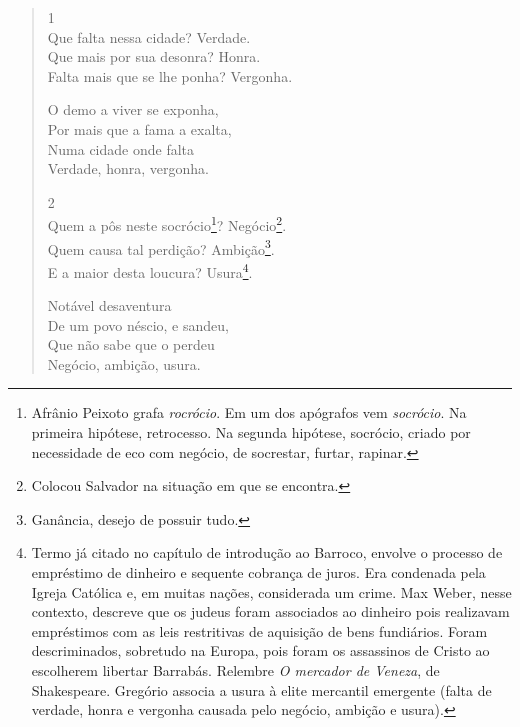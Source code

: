 \begin{verse}
1 \\
Que falta nessa cidade? \dotfill Verdade. \\
Que mais por sua desonra? \dotfill Honra. \\
Falta mais que se lhe ponha? \dotfill Vergonha.
			
\hspace{5em} O demo a viver se exponha, \\
\hspace{5em} Por mais que a fama a exalta, \\
\hspace{5em} Numa cidade onde falta \\
\hspace{5em} Verdade, honra, vergonha. 
			
2 \\
Quem a pôs neste socrócio\footnote{Afrânio Peixoto grafa \textit{rocrócio}. Em um dos apógrafos vem \textit{socrócio}. Na primeira hipótese, retrocesso. Na segunda hipótese, socrócio, criado por necessidade de eco com negócio, de socrestar, furtar, rapinar.}? \dotfill Negócio\footnote{Colocou Salvador na situação em que se encontra.}. \\
Quem causa tal perdição? \dotfill Ambição\footnote{Ganância, desejo de possuir tudo.}. \\
E a maior desta loucura? \dotfill Usura\footnote{Termo já citado no capítulo de introdução ao Barroco, envolve o processo de empréstimo de dinheiro e sequente cobrança de juros. Era condenada pela Igreja Católica e, em muitas nações, considerada um crime. Max Weber, nesse contexto, descreve que os judeus foram associados ao dinheiro pois realizavam empréstimos com as leis restritivas de aquisição de bens fundiários. Foram descriminados, sobretudo na Europa, pois foram os assassinos de Cristo ao escolherem libertar Barrabás. Relembre \textit{O mercador de Veneza}, de Shakespeare. Gregório associa a usura à elite mercantil emergente (falta de verdade, honra e vergonha causada pelo negócio, ambição e usura).}.
			
\hspace{5em} Notável desaventura \\
\hspace{5em} De um povo néscio, e sandeu, \\
\hspace{5em} Que não sabe que o perdeu \\
\hspace{5em} Negócio, ambição, usura.
			

\end{verse}
